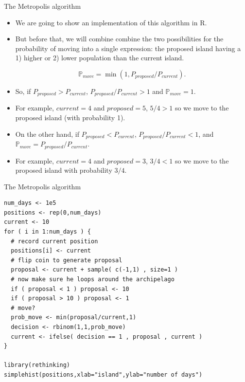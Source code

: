 \documentclass[handout]{beamer}
\begin{document}
\begin{frame}{The Metropolis algorithm}
\scriptsize{

\begin{itemize}
\item We are going to show an implementation of this algorithm in R.

\item But before that, we will combine combine the two possibilities for the probability of moving into a single expression: the proposed island having a 1) higher or 2) lower population than the current island.

\begin{equation}
\mathbb{P}_{move}=\min(1,P_{proposed}/P_{current}).
\end{equation}

\item So, if $P_{proposed}>P_{current}$, $P_{proposed}/P_{current}>1$ and $\mathbb{P}_{move}=1$.

\item For example, $current=4$ and $proposed=5$, $5/4>1$ so we move to the proposed island (with probability 1). 

\item On the other hand, if $P_{proposed}<P_{current}$, $P_{proposed}/P_{current}<1$, and $\mathbb{P}_{move}=P_{proposed}/P_{current}$.

\item For example, $current=4$ and $proposed=3$, $3/4<1$ so we move to the proposed island with probability $3/4$.

\end{itemize}


} 
\end{frame}



\begin{frame}[fragile]{The Metropolis algorithm}
\scriptsize{


\begin{verbatim}
num_days <- 1e5
positions <- rep(0,num_days)
current <- 10
for ( i in 1:num_days ) {
  # record current position
  positions[i] <- current
  # flip coin to generate proposal
  proposal <- current + sample( c(-1,1) , size=1 )
  # now make sure he loops around the archipelago
  if ( proposal < 1 ) proposal <- 10
  if ( proposal > 10 ) proposal <- 1
  # move?
  prob_move <- min(proposal/current,1)
  decision <- rbinom(1,1,prob_move)
  current <- ifelse( decision == 1 , proposal , current )
}

library(rethinking)
simplehist(positions,xlab="island",ylab="number of days")
\end{verbatim}



} 
\end{frame}
\end{document}
